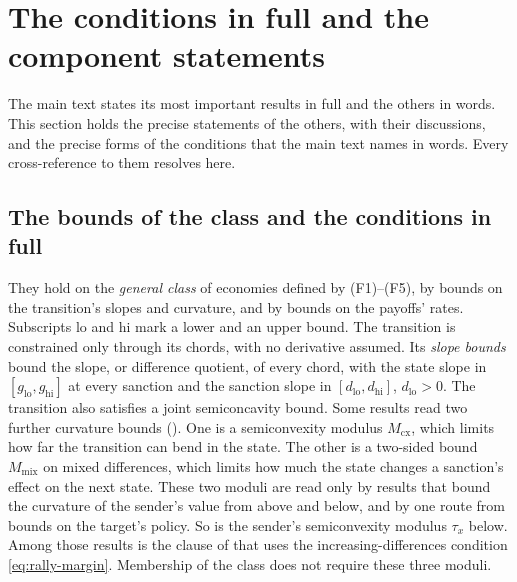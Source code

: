 \section{The conditions in full and the component statements}
\label{sec:moved-main-2026-10-13}

The main text states its most important results in full and the others in words.
This section holds the precise statements of the others, with their discussions, and
the precise forms of the conditions that the main text names in words. Every
cross-reference to them resolves here.

\subsection{The bounds of the class and the conditions in full}
\label{sec:moved-main-2026-10-13:conditions}

 They hold on the \emph{general class} of economies
defined by \textup{(F1)--(F5)}, by bounds on the transition's slopes and
curvature, and by bounds on the payoffs' rates. Subscripts $\mathrm{lo}$ and $\mathrm{hi}$ mark a
lower and an upper bound. The transition is constrained
only through its chords, with no derivative assumed. Its \emph{slope bounds}
bound the slope, or difference quotient, of every chord, with the state slope
in $[g_{\mathrm{lo}},g_{\mathrm{hi}}]$ at every sanction and the sanction slope
in $[d_{\mathrm{lo}},d_{\mathrm{hi}}]$, $d_{\mathrm{lo}}>0$. The transition
also satisfies a joint semiconcavity bound. Some results read two further
curvature bounds (). One is a semiconvexity modulus
$M_{\mathrm{cx}}$, which limits how far the transition can bend in the state.
The other is a two-sided bound $M_{\mathrm{mix}}$ on mixed differences, which
limits how much the state changes a sanction's effect on the next state. These
two moduli are read only by results that bound the curvature of the sender's
value from above and below, and by one route from bounds on the target's policy.
So is the sender's semiconvexity modulus $\tau_x$ below. Among those results is
the clause of  that uses the increasing-differences
condition \eqref{eq:rally-margin}.
Membership of the class does not require these three moduli.

